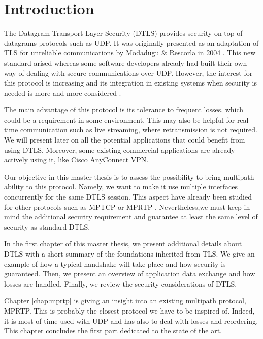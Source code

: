 \chapter*{Introduction}

The Datagram Transport Layer Security (DTLS) provides security on top of datagrams protocols such as UDP. It was originally presented as an adaptation of TLS \cite{rfc5246} for unreliable communications by Modadugu \& Rescorla in 2004 \cite{modadugu2004design}. This new standard arised whereas some software developers already had built their own way of dealing with secure communications over UDP. However, the interest for this protocol is increasing and its integration in existing systems when security is needed is more and more considered \cite{dtls-as-subtransport}.

The main advantage of this protocol is its tolerance to frequent losses, which could be a requirement in some environment. This may also be helpful for real-time communication such as live streaming, where retransmission is not required. We will present later on all the potential applications that could benefit from using DTLS. Moreover, some existing commercial applications are already actively using it, like Cisco AnyConnect VPN\cite{anyconnect}.


Our objective in this master thesis is to assess the possibility to bring multipath ability to this protocol. Namely, we want to make it use multiple interfaces concurrently for the same DTLS session. This aspect have already been studied for other protocols such as MPTCP \cite{RFC6824} or MPRTP \cite{singh-avtcore-mprtp}. Nevertheless,we must keep in mind the additional security requirement and guarantee at least the same level of security as standard DTLS.

In the first chapter of this master thesis, we present additional details about DTLS with a short summary of the foundations inherited from TLS. We give an example of how a typical handshake will take place and how security is guaranteed. Then, we present an overview of application data exchange and how losses are handled. Finally, we review the security considerations of DTLS.

Chapter \ref{chap:mprtp} is giving an insight into an existing multipath protocol, MPRTP. This is probably the closest protocol we have to be inspired of. Indeed, it is most of time used with UDP and has also to deal with losses and reordering. This chapter concludes the first part dedicated to the state of the art.

